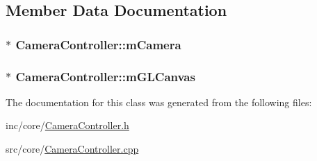 \subsection{Member Data Documentation}
\hypertarget{class_camera_controller_a1532badd6fe0da6b2504965ab8e0b0a0}{
\subsubsection[{m\+Camera}]{$\ast$ Camera\+Controller\+::m\+Camera\hspace{0.3cm}{\ttfamily [protected]}}}\label{class_camera_controller_a1532badd6fe0da6b2504965ab8e0b0a0}
\hypertarget{class_camera_controller_a4147c2aa9d233041e4fb5c9683dbdc0c}{
\subsubsection[{m\+G\+L\+Canvas}]{$\ast$ Camera\+Controller\+::m\+G\+L\+Canvas\hspace{0.3cm}{\ttfamily [protected]}}}\label{class_camera_controller_a4147c2aa9d233041e4fb5c9683dbdc0c}


The documentation for this class was generated from the following files\+:\begin{DoxyCompactItemize}
\item 
inc/core/\hyperlink{_camera_controller_8h}{Camera\+Controller.\+h}\item 
src/core/\hyperlink{_camera_controller_8cpp}{Camera\+Controller.\+cpp}\end{DoxyCompactItemize}
